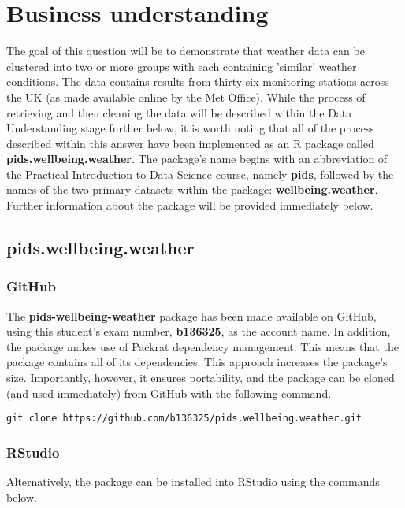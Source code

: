 \documentclass[12pt, oneside, openany]{book}
\begin{document}
\section*{Business understanding}
The goal of this question will be to demonstrate that weather data can be clustered into two or more groups with each containing 'similar' weather conditions. The data contains results from thirty six monitoring stations across the UK (as made available online by the Met Office). While the process of retrieving and then cleaning the data will be described within the Data Understanding stage further below, it is worth noting that all of the process described within this answer have been implemented as an R package called \textbf{pids.wellbeing.weather}. The package's name begins with an abbreviation of the Practical Introduction to Data Science course, namely \textbf{pids}, followed by the names of the two primary datasets within the package: \textbf{wellbeing.weather}. Further information about the package will be provided immediately below.

\subsection*{pids.wellbeing.weather}

\subsubsection*{GitHub}
The \textbf{pids-wellbeing-weather} package has been made available on GitHub\cite{pids.wellbeing.weather}, using this student's exam number, \textbf{b136325}, as the account name. In addition, the package makes use of Packrat\cite{packrat} dependency management. This means that the package contains all of its dependencies. This approach increases the package's size. Importantly, however, it ensures portability, and the package can be cloned (and used immediately) from GitHub with the following command.

\begin{verbatim}
git clone https://github.com/b136325/pids.wellbeing.weather.git
\end{verbatim}

\subsubsection*{RStudio}
Alternatively, the package can be installed into RStudio using the commands below.
\end{document}
